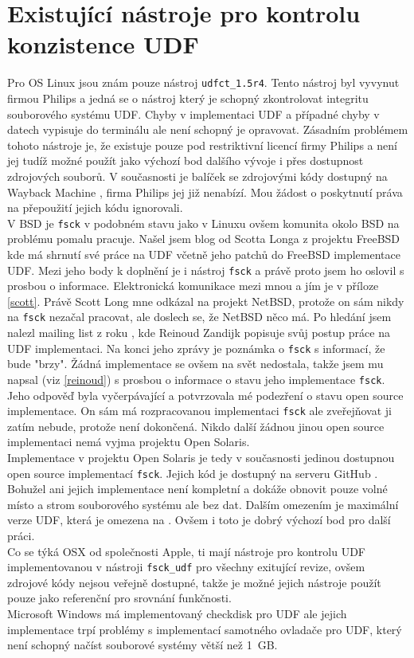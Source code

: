 \section{Existující nástroje pro kontrolu konzistence UDF}
Pro OS Linux jsou znám pouze nástroj \texttt{udfct\_1.5r4}. Tento nástroj byl vyvynut firmou Philips a jedná se o nástroj který je schopný zkontrolovat integritu souborového systému UDF. Chyby v implementaci UDF a případné chyby v datech vypisuje do terminálu ale není schopný je opravovat. Zásadním problémem tohoto nástroje je, že existuje pouze pod restriktivní licencí firmy Philips a není jej tudíž možné použít jako výchozí bod dalšího vývoje i přes dostupnost zdrojových souborů. V současnosti je balíček se zdrojovými kódy dostupný na Wayback Machine \cite{wayback}, firma Philips jej již nenabízí. Mou žádost o poskytnutí práva na přepoužití jejich kódu ignorovali.\\
V BSD je \texttt{fsck} v podobném stavu jako v Linuxu ovšem komunita okolo BSD na problému pomalu pracuje. Našel jsem blog \cite{scottuvblog} od Scotta Longa z projektu FreeBSD kde má shrnutí své práce na UDF včetně jeho patchů do FreeBSD implementace UDF. Mezi jeho body k doplnění je i nástroj \texttt{fsck} a právě proto jsem ho oslovil s prosbou o informace. Elektronická komunikace mezi mnou a jím je v příloze \ref{scott}. Právě Scott Long mne odkázal na projekt NetBSD, protože on sám nikdy na \texttt{fsck} nezačal pracovat, ale doslech se, že NetBSD něco má. Po hledání jsem nalezl mailing list z roku , kde Reinoud Zandijk popisuje svůj postup práce na UDF implementaci. Na konci jeho zprávy je poznámka o \texttt{fsck} s informací, že bude "brzy". Žádná implementace se ovšem na svět nedostala, takže jsem mu napsal (viz \ref{reinoud}) s prosbou o informace o  stavu jeho implementace \texttt{fsck}. Jeho odpověď byla vyčerpávající a potvrzovala mé podezření o stavu open source implementace. On sám má rozpracovanou implementaci \texttt{fsck} ale zveřejňovat ji zatím nebude, protože není dokončená. Nikdo další žádnou jinou open source implementaci nemá vyjma projektu Open Solaris.\\
Implementace v projektu Open Solaris je tedy v současnosti jedinou dostupnou open source implementací \texttt{fsck}. Jejich kód je dostupný na serveru GitHub \cite{solaris-github}. Bohužel ani jejich implementace není kompletní a dokáže obnovit pouze volné místo a strom souborového systému ale bez dat. Dalším omezením je maximální verze UDF, která je omezena na . Ovšem i toto je dobrý výchozí bod pro další práci.\\
Co se týká OSX od společnosti Apple, ti mají nástroje pro kontrolu UDF implementovanou v nástroji \texttt{fsck\_udf} pro všechny exitující revize, ovšem zdrojové kódy nejsou veřejně dostupné, takže je možné jejich nástroje použít pouze jako referenční pro srovnání funkčnosti.\\
Microsoft Windows má implementovaný checkdisk pro UDF ale jejich implementace trpí problémy s implementací samotného ovladače pro UDF, který není schopný načíst souborové systémy větší než 1~GB.\\

 

